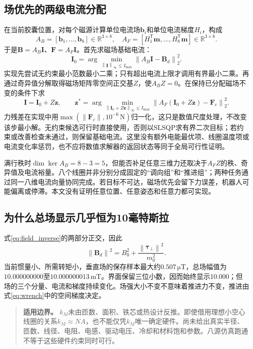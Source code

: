 \documentclass[UTF8,a4paper,zihao=5,fontset=windows]{ctexart}
\newcommand{\vect}[1]{\bm{#1}}
\newcommand{\norm}[1]{\left\lVert#1\right\rVert}
\newcommand{\unit}[1]{\,\mathrm{#1}}
\newenvironment{boundary}{\begin{quote}\small\color{navy}\textbf{适用边界。}}{\end{quote}}
\begin{document}
\subsection{场优先的两级电流分配}
在当前胶囊位置，对每个磁源计算单位电流场$\vect b_i$和单位电流梯度$H_i$，构成
\begin{equation}
A_B=[\vect b_1,\ldots,\vect b_8]\in\mathbb R^{3\times8},\quad
A_F=[H_1^{\mathsf T}\vect m,\ldots,H_8^{\mathsf T}\vect m]\in\mathbb R^{3\times8}.
\label{eq:actuation_matrices}
\end{equation}
于是$\vect B=A_B\vect I$、$\vect F=A_F\vect I$。首先求磁场基础电流：
\begin{equation}
\vect I_0=\arg\min_{\norm{\vect I}_\infty\le I_{\max}}\norm{A_B\vect I-\vect B_d}_2^2.
\label{eq:field_allocation}
\end{equation}
实现先尝试无约束最小范数最小二乘；只有超出电流上限才调用有界最小二乘。再通过奇异值分解取得磁场矩阵零空间正交基$Z$，使$A_BZ=0$。在保持已分配磁场不变的条件下求
\begin{equation}
\vect I=\vect I_0+Z\vect z,\qquad
\vect z^*=\arg\min_{\norm{\vect I_0+Z\vect z}_\infty\le I_{\max}}\norm{A_F(\vect I_0+Z\vect z)-\vect F_c}_2^2.
\label{eq:nullspace_allocation}
\end{equation}
力残差在实现中用$\max(\norm{\vect F_c},10^{-6}\unit N)$归一化，这只是数值尺度处理，不改变该步最小解。无约束候选可行时直接使用，否则以SLSQP求有界二次目标；若约束或改善检查未通过，则保留基础电流。这里没有额外电能最优项、线圈温度项或电流变化率惩罚，也不应将数值求解器的返回状态等同于全局可行性证明。

满行秩时$\dim\ker A_B=8-3=5$，但能否补足任意三维力还取决于$A_FZ$的秩、奇异值及电流裕量。八个线圈并非分别分成固定的“调向组”和“推进组”；两种任务通过同一八维电流向量协同完成。若目标不可达，磁场优先会留下力误差，机器人可能偏离或停滞。本文没有证明任意位置、任意姿态和任意力都可实现。

\subsection{为什么总场显示几乎恒为10毫特斯拉}
式\eqref{eq:field_inverse}的两部分正交，因此
\begin{equation}
\norm{\vect B_d}^2=B_0^2+\frac{\norm{\vect\tau_\perp}^2}{m_0^2}.
\label{eq:field_norm}
\end{equation}
当前惯量小、所需转矩小，垂直场的保存样本最大约$0.507\unit{\mu T}$，总场幅值为$10.000000000$至$10.000000013\unit{mT}$。界面保留三位小数，因而始终显示10.000；但场的三个分量、电流和梯度持续变化。场强大小不变不意味着推进力不变，推进由式\eqref{eq:wrench}中的空间梯度决定。
\begin{boundary}
$k_M$未由匝数、面积、铁芯或热设计反推。即使借用理想小空心线圈的关系$k_M\approx NA$，也不能仅凭$k_M$唯一确定硬件。尚未给出真实半径、匝数、线径、电阻、电感、驱动电压、冷却和材料饱和参数。八源仿真跑通不等于这些硬件约束同时可行。
\end{boundary}
\end{document}
